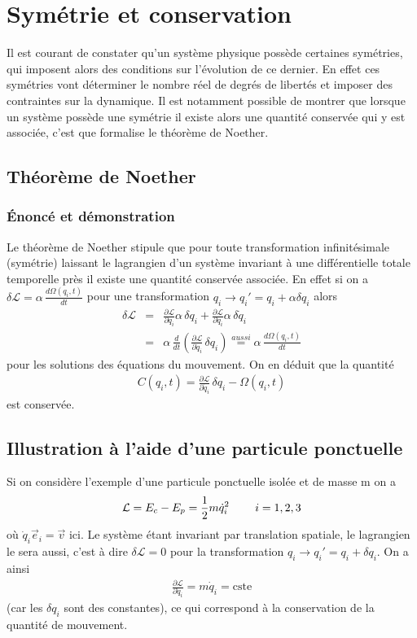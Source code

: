 \documentclass[12pt,prb,aps,epsf]{report}
\begin{document}
\section{Symétrie et conservation}

Il est courant de constater qu'un système physique possède certaines symétries, qui imposent alors des conditions sur l'évolution de ce dernier. En effet ces symétries vont déterminer le nombre réel de degrés de libertés et imposer des contraintes sur la dynamique. Il est notamment possible de montrer que lorsque un système possède une symétrie il existe alors une quantité conservée qui y est associée, c'est que formalise le théorème de Noether.
\subsection{Théorème de Noether}
\subsubsection{Énoncé et démonstration}
Le théorème de Noether stipule que pour toute transformation infinitésimale (symétrie) laissant le lagrangien d'un système invariant à une différentielle totale temporelle près il existe une quantité conservée associée. En effet si on a $\delta \mathcal{L} = \alpha\,\frac{d\Omega(q_i,t)}{dt}$ pour une transformation $q_i\rightarrow q_i'=q_i+\alpha \delta q_i$ alors
\begin{eqnarray}
\delta \mathcal{L} &=& \frac{\partial\mathcal{L}}{\partial q_i}\alpha \,\delta q_i + \frac{\partial\mathcal{L}}{\partial \dot{q}_i}\alpha\, \delta \dot{q}_i\\
&=& \alpha\, \frac{d}{dt}\left(\frac{\partial \mathcal{L}}{\partial  \dot{q}_i} \,\delta q_i\right) \stackrel{aussi}{=} \alpha\,\frac{d\Omega(q_i,t)}{dt}
\end{eqnarray}
pour les solutions des équations du mouvement. On en déduit que la quantité
\begin{eqnarray}
C(q_i,t) = \frac{\partial \mathcal{L}}{\partial  \dot{q}_i} \,\delta q_i - \Omega(q_i,t)
\end{eqnarray}
est conservée.

\subsection{Illustration à l'aide d'une particule ponctuelle}
Si on considère l'exemple d'une particule ponctuelle isolée et de masse m on a
\begin{eqnarray}
\mathcal{L} = E_c-E_p = \frac{1}{2}m\dot{q}_i^2 \hspace{0.8cm}i=1,2,3
\end{eqnarray}
où $\dot{q}_i\vec{e}_i=\vec{v}$ ici. Le système étant invariant par translation spatiale, le lagrangien le sera aussi, c'est à dire $\delta \mathcal{L} = 0$ pour la transformation $q_i\rightarrow q_i'=q_i +\delta q_i$. On a ainsi 
\begin{eqnarray}
\frac{\partial \mathcal{L}}{\partial  \dot{q}_i} = m \dot{q}_i = \mathrm{cste}
\end{eqnarray}
(car les $\delta q_i$ sont des constantes), ce qui correspond à la conservation de la quantité de mouvement. \\
\end{document}

